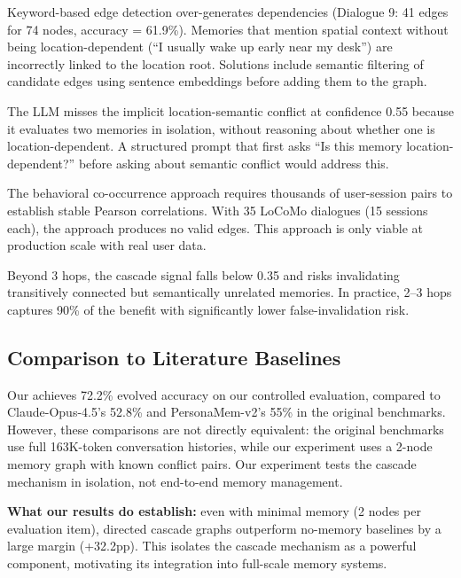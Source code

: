 Keyword-based \locatedin edge detection over-generates dependencies (Dialogue 9: 41 edges for 74 nodes, accuracy = 61.9\%). Memories that mention spatial context without being location-dependent (\eg ``I usually wake up early near my desk'') are incorrectly linked to the location root. Solutions include semantic filtering of candidate edges using sentence embeddings before adding them to the graph.

The LLM misses the implicit location-semantic conflict at confidence 0.55 because it evaluates two memories in isolation, without reasoning about whether one is location-dependent. A structured prompt that first asks ``Is this memory location-dependent?'' before asking about semantic conflict would address this.

The behavioral co-occurrence approach requires thousands of user-session pairs to establish stable Pearson correlations. With 35 LoCoMo dialogues (15 sessions each), the approach produces no valid edges. This approach is only viable at production scale with real user data.

Beyond 3 hops, the cascade signal falls below 0.35 and risks invalidating transitively connected but semantically unrelated memories. In practice, 2--3 hops captures 90\% of the benefit with significantly lower false-invalidation risk.

\subsection{Comparison to Literature Baselines}
\label{sec:discussion:comparison}

Our \fullcascade achieves 72.2\% evolved accuracy on our controlled \horizonbench evaluation, compared to Claude-Opus-4.5's 52.8\% and PersonaMem-v2's 55\% in the original benchmarks. However, these comparisons are not directly equivalent: the original benchmarks use full 163K-token conversation histories, while our experiment uses a 2-node memory graph with known conflict pairs. Our experiment tests the cascade mechanism in isolation, not end-to-end memory management.

{\bf What our results do establish:} even with minimal memory (2 nodes per evaluation item), directed cascade graphs outperform no-memory baselines by a large margin (+32.2pp). This isolates the cascade mechanism as a powerful component, motivating its integration into full-scale memory systems.

